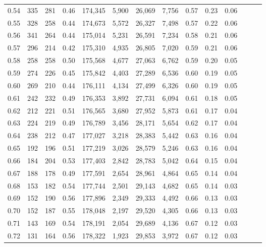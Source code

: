 \begin{tabular}{rrrrrrrrrrrrrr}
0.54 &     335 &  281 &  0.46 &  174,345 &    5,900 &  26,069 &   7,756 &  0.57 &  0.23 &      0.06 \\
0.55 &     328 &  258 &  0.44 &  174,673 &    5,572 &  26,327 &   7,498 &  0.57 &  0.22 &      0.06 \\
0.56 &     341 &  264 &  0.44 &  175,014 &    5,231 &  26,591 &   7,234 &  0.58 &  0.21 &      0.06 \\
0.57 &     296 &  214 &  0.42 &  175,310 &    4,935 &  26,805 &   7,020 &  0.59 &  0.21 &      0.06 \\
0.58 &     258 &  258 &  0.50 &  175,568 &    4,677 &  27,063 &   6,762 &  0.59 &  0.20 &      0.05 \\
0.59 &     274 &  226 &  0.45 &  175,842 &    4,403 &  27,289 &   6,536 &  0.60 &  0.19 &      0.05 \\
0.60 &     269 &  210 &  0.44 &  176,111 &    4,134 &  27,499 &   6,326 &  0.60 &  0.19 &      0.05 \\
0.61 &     242 &  232 &  0.49 &  176,353 &    3,892 &  27,731 &   6,094 &  0.61 &  0.18 &      0.05 \\
0.62 &     212 &  221 &  0.51 &  176,565 &    3,680 &  27,952 &   5,873 &  0.61 &  0.17 &      0.04 \\
0.63 &     224 &  219 &  0.49 &  176,789 &    3,456 &  28,171 &   5,654 &  0.62 &  0.17 &      0.04 \\
0.64 &     238 &  212 &  0.47 &  177,027 &    3,218 &  28,383 &   5,442 &  0.63 &  0.16 &      0.04 \\
0.65 &     192 &  196 &  0.51 &  177,219 &    3,026 &  28,579 &   5,246 &  0.63 &  0.16 &      0.04 \\
0.66 &     184 &  204 &  0.53 &  177,403 &    2,842 &  28,783 &   5,042 &  0.64 &  0.15 &      0.04 \\
0.67 &     188 &  178 &  0.49 &  177,591 &    2,654 &  28,961 &   4,864 &  0.65 &  0.14 &      0.04 \\
0.68 &     153 &  182 &  0.54 &  177,744 &    2,501 &  29,143 &   4,682 &  0.65 &  0.14 &      0.03 \\
0.69 &     152 &  190 &  0.56 &  177,896 &    2,349 &  29,333 &   4,492 &  0.66 &  0.13 &      0.03 \\
0.70 &     152 &  187 &  0.55 &  178,048 &    2,197 &  29,520 &   4,305 &  0.66 &  0.13 &      0.03 \\
0.71 &     143 &  169 &  0.54 &  178,191 &    2,054 &  29,689 &   4,136 &  0.67 &  0.12 &      0.03 \\
0.72 &     131 &  164 &  0.56 &  178,322 &    1,923 &  29,853 &   3,972 &  0.67 &  0.12 &      0.03 \\

\end{tabular}
